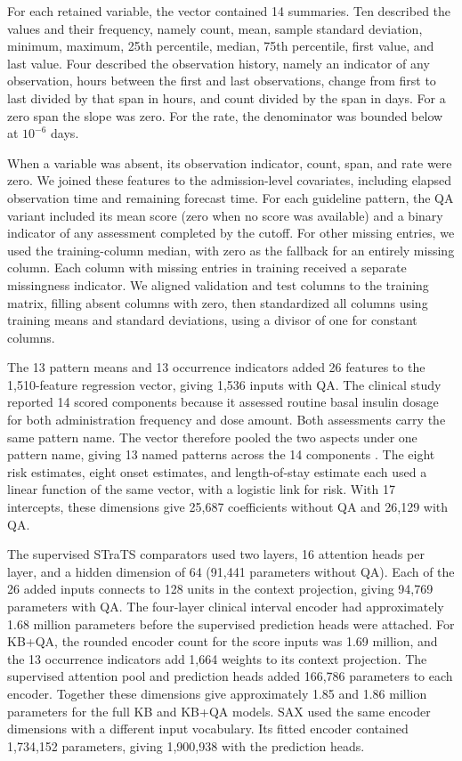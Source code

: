 ﻿\documentclass[11pt,a4paper]{article}
\begin{document}
For each retained variable, the vector contained 14 summaries. Ten described the values and their frequency, namely count, mean, sample standard deviation, minimum, maximum, 25th percentile, median, 75th percentile, first value, and last value. Four described the observation history, namely an indicator of any observation, hours between the first and last observations, change from first to last divided by that span in hours, and count divided by the span in days. For a zero span the slope was zero. For the rate, the denominator was bounded below at $10^{-6}$ days.

When a variable was absent, its observation indicator, count, span, and rate were zero. We joined these features to the admission-level covariates, including elapsed observation time and remaining forecast time. For each guideline pattern, the QA variant included its mean score (zero when no score was available) and a binary indicator of any assessment completed by the cutoff. For other missing entries, we used the training-column median, with zero as the fallback for an entirely missing column. Each column with missing entries in training received a separate missingness indicator. We aligned validation and test columns to the training matrix, filling absent columns with zero, then standardized all columns using training means and standard deviations, using a divisor of one for constant columns.

The 13 pattern means and 13 occurrence indicators added 26 features to the 1,510-feature regression vector, giving 1,536 inputs with QA. The clinical study reported 14 scored components because it assessed routine basal insulin dosage for both administration frequency and dose amount. Both assessments carry the same pattern name. The vector therefore pooled the two aspects under one pattern name, giving 13 named patterns across the 14 components \citep{oded2027kineret-jbi}. The eight risk estimates, eight onset estimates, and length-of-stay estimate each used a linear function of the same vector, with a logistic link for risk. With 17 intercepts, these dimensions give 25,687 coefficients without QA and 26,129 with QA. 

The supervised STraTS comparators used two layers, 16 attention heads per layer, and a hidden dimension of 64 (91,441 parameters without QA). Each of the 26 added inputs connects to 128 units in the context projection, giving 94,769 parameters with QA. The four-layer clinical interval encoder had approximately 1.68 million parameters before the supervised prediction heads were attached. For KB+QA, the rounded encoder count for the score inputs was 1.69 million, and the 13 occurrence indicators add 1,664 weights to its context projection. The supervised attention pool and prediction heads added 166,786 parameters to each encoder. Together these dimensions give approximately 1.85 and 1.86 million parameters for the full KB and KB+QA models. SAX used the same encoder dimensions with a different input vocabulary. Its fitted encoder contained 1,734,152 parameters, giving 1,900,938 with the prediction heads.
\end{document}

